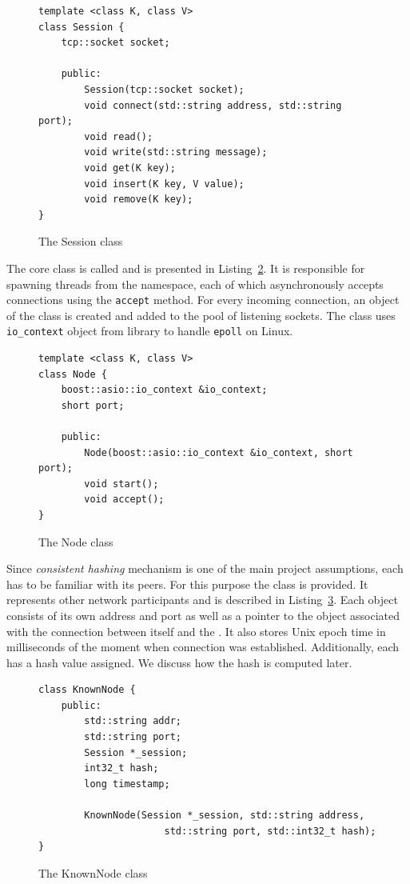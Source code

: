\begin{figure}[ht] 
\renewcommand{\figurename}{Listing}
    \begin{lstlisting}
template <class K, class V>
class Session {
    tcp::socket socket;
    
    public:
        Session(tcp::socket socket);
        void connect(std::string address, std::string port);
        void read();
        void write(std::string message);
        void get(K key);
        void insert(K key, V value);
        void remove(K key);
}
\end{lstlisting}
\caption{The Session class}
\label{SessionListing}
\end{figure}

The core class is called \Node and is presented in Listing~\ref{NodeListing}. 
It is responsible for spawning threads from the \std namespace, each of which asynchronously accepts connections using the \texttt{accept} method.
For every incoming connection, an object of the \Session class is created and added to the pool of listening sockets.
The class uses \texttt{io\_context} object from \Asio library to handle \texttt{epoll} on Linux.

\begin{figure}[ht] 
\renewcommand{\figurename}{Listing}
\begin{lstlisting}
template <class K, class V>
class Node {
    boost::asio::io_context &io_context;
    short port;
    
    public:
        Node(boost::asio::io_context &io_context, short port);
        void start();
        void accept();
}
    \end{lstlisting}
\caption{The Node class}
\label{NodeListing}
\end{figure}
        
Since \textit{consistent hashing} mechanism is one of the main project assumptions, each \Node has to be familiar with its peers.
For this purpose the \KnownNode class is provided. 
It represents other network participants and is described in Listing~\ref{Node}.
Each \KnownNode object consists of its own address and port as well as a pointer to the \Session object associated with the connection between itself and the \Node.
It also stores Unix epoch time in milliseconds of the moment when connection was established.
Additionally, each \KnownNode has a hash value assigned. We discuss how the hash is computed later.

\begin{figure}[ht] 
\renewcommand{\figurename}{Listing}
    \begin{lstlisting}
class KnownNode {
    public:
        std::string addr;
        std::string port;
        Session *_session;
        int32_t hash;
        long timestamp;

        KnownNode(Session *_session, std::string address,
                      std::string port, std::int32_t hash);
}
    \end{lstlisting}
    
\caption{The KnownNode class}
\label{Node}
\end{figure}

